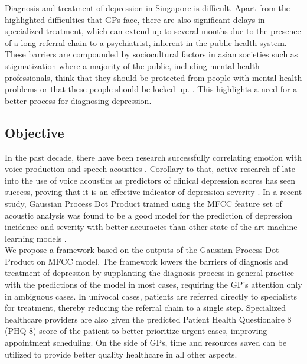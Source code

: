\documentclass{article}
\begin{document}
	Diagnosis and treatment of depression in Singapore is difficult. Apart from the highlighted difficulties that GPs face, there are also significant delays in specialized treatment, which can extend up to several months due to the presence of a long referral chain to a psychiatrist, inherent in the public health system. These barriers are compounded by sociocultural factors in asian societies such as stigmatization where a majority of the public, including mental health professionals, think that they should be protected from people with mental health problems or that these people should be locked up. \cite{chong2009}. This highlights a need for a better process for diagnosing depression. \\
	
	\subsection{Objective}
	In the past decade, there have been research successfully correlating emotion with voice production and speech acoustics \cite{uwa2001}. 
	Corollary to that, active research of late into the use of voice acoustics as predictors of clinical depression scores has seen success, proving that it is an effective indicator of depression severity \cite{jov2016}. In a recent study, Gaussian Process Dot Product trained using the MFCC feature set of acoustic analysis was found to be a good model for the prediction of depression incidence and severity with better accuracies than other state-of-the-art machine learning models \cite{cs42462016}. \\

	We propose a framework based on the outputs of the Gaussian Process Dot Product on MFCC model. The framework lowers the barriers of diagnosis and treatment of depression by supplanting the diagnosis process in general practice with the predictions of the model in most cases, requiring the GP's attention only in ambiguous cases. In univocal cases, patients are referred directly to specialists for treatment, thereby reducing the referral chain to a single step. Specialized healthcare providers are also given the predicted Patient Health Questionaire 8 (PHQ-8) score of the patient to better prioritize urgent cases, improving appointment scheduling. On the side of GPs, time and resources saved can be utilized to provide better quality healthcare in all other aspects.
	
\end{document}
